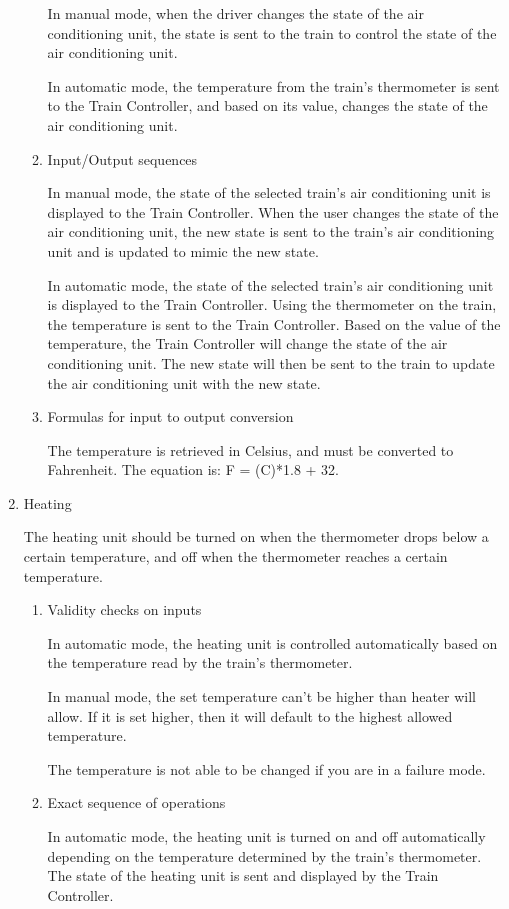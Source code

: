 \documentclass[11pt]{article}
\begin{document}
\begin{enumerate}
\begin{enumerate}
In manual mode, when the driver changes the state of the air conditioning unit, the state is sent to the train to control the state of the air conditioning unit. 

In automatic mode, the temperature from the train's thermometer is sent to the Train Controller, and based on its value, changes the state of the air conditioning unit. 
\item Input/Output sequences
\label{sec-3-1-5-6-7}

In manual mode, the state of the selected train's air conditioning unit is displayed to the Train Controller. When the user changes the state of the air conditioning unit, the new state is sent to the train's air conditioning unit and is updated to mimic the new state. 

In automatic mode, the state of the selected train's air conditioning unit is displayed to the Train Controller. Using the thermometer on the train, the temperature is sent to the Train Controller. Based on the value of the temperature, the Train Controller will change the state of the air conditioning unit. The new state will then be sent to the train to update the air conditioning unit with the new state. 
\item Formulas for input to output conversion
\label{sec-3-1-5-6-8}

The temperature is retrieved in Celsius, and must be converted to Fahrenheit. The equation is: F = (C)*1.8 + 32.
\end{enumerate}
\item Heating
\label{sec-3-1-5-7}

The heating unit should be turned on when the thermometer drops below a certain temperature, and off when the thermometer reaches a certain temperature.
\begin{enumerate}
\item Validity checks on inputs
\label{sec-3-1-5-7-1}

In automatic mode, the heating unit is controlled automatically based on the temperature read by the train's thermometer.

In manual mode, the set temperature can't be higher than heater will allow. If it is set higher, then it will default to the highest allowed temperature.

The temperature is not able to be changed if you are in a failure mode.
\item Exact sequence of operations
\label{sec-3-1-5-7-2}

In automatic mode, the heating unit is turned on and off automatically depending on the temperature determined by the train's thermometer. The state of the heating unit is sent and displayed by the Train Controller.  


\end{enumerate}
\end{enumerate}
\end{document}
